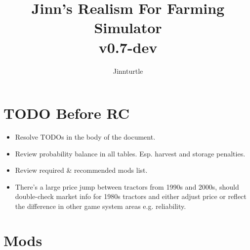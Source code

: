 \documentclass[a4paper,10pt]{article}
\begin{document}
\newlength{\tabcolsepDefault}
\setlength{\tabcolsepDefault}{\tabcolsep}




\newcommand{\textbi}[1]{\textbf{\textit{#1}}}

\newcommand{\projName}{Jinn's Realism For Farming Simulator}
\newcommand{\projVersion}{v0.7-dev}

\newcommand{\refPageref}[1]{\ref{#1} (p. \pageref{#1})}


\title{\projName{}\\ \projVersion{}}
\author{Jinnturtle}

\maketitle
\tableofcontents


\section{TODO Before RC}
\begin{itemize}
\item Resolve TODOs in the body of the document.
\item Review probability balance in all tables. Esp. harvest and storage
  penalties.
\item Review required & recommended mods list.
\item There's a large price jump between tractors from 1990s and 2000s,
  should double-check market info for 1980s tractors and either adjust price or
  reflect the difference in other game system areas e.g. reliability.
\end{itemize}


\section{Mods}
\end{document}
